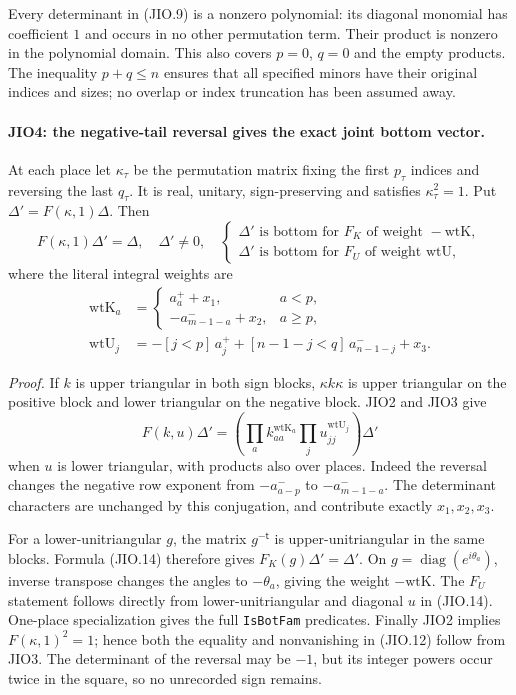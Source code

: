 Every determinant in (JIO.9) is a nonzero polynomial: its diagonal
monomial has coefficient \(1\) and occurs in no other permutation
term.  Their product is nonzero in the polynomial domain.  This
also covers \(p=0\), \(q=0\) and the empty products.  The inequality
\(p+q\le n\) ensures that all specified minors have their original
indices and sizes; no overlap or index truncation has been assumed
away.

\paragraph{JIO4: the negative-tail reversal gives the exact joint bottom vector.}
\label{claim:JIO4}
At each place let \(\kappa_\tau\) be the permutation matrix fixing
the first \(p_\tau\) indices and reversing the last \(q_\tau\).
It is real, unitary, sign-preserving and satisfies \(\kappa_\tau^2=1\).
Put \(\Delta'=F(\kappa,1)\Delta\).  Then
\[
 F(\kappa,1)\Delta'=\Delta,\quad \Delta'\ne0,
 \quad
 \begin{cases}
 \Delta'\text{ is bottom for }F_K\text{ of weight }-\mathrm{wtK},\\
 \Delta'\text{ is bottom for }F_U\text{ of weight }\mathrm{wtU},
 \end{cases}
 \tag{JIO.12}
\]
where the literal integral weights are
\[
 \begin{split}
 \mathrm{wtK}_a&=
   \begin{cases}a^+_a+x_1,&a<p,\\
                -a^-_{m-1-a}+x_2,&a\ge p,\end{cases}\\
 \mathrm{wtU}_j&=-[j<p]\,a^+_j
                  +[n-1-j<q]\,a^-_{n-1-j}+x_3 .
 \end{split}
 \tag{JIO.13}
\]

\emph{Proof.}
If \(k\) is upper triangular in both sign blocks,
\(\kappa k\kappa\) is upper triangular on the positive block
and lower triangular on the negative block.  JIO2 and JIO3 give
\[
 F(k,u)\Delta'
       =\left(\prod_a k_{aa}^{\mathrm{wtK}_a}
                    \prod_j u_{jj}^{\mathrm{wtU}_j}\right)\Delta'
 \tag{JIO.14}
\]
when \(u\) is lower triangular, with products also over places.
Indeed the reversal changes the negative row exponent from
\(-a^-_{a-p}\) to \(-a^-_{m-1-a}\).  The determinant characters
are unchanged by this conjugation, and contribute exactly
\(x_1,x_2,x_3\).

For a lower-unitriangular \(g\), the matrix \(g^{-\mathsf t}\)
is upper-unitriangular in the same blocks.  Formula (JIO.14)
therefore gives \(F_K(g)\Delta'=\Delta'\).  On
\(g=\operatorname{diag}(e^{i\theta_a})\), inverse transpose changes
the angles to \(-\theta_a\), giving the weight \(-\mathrm{wtK}\).
The \(F_U\) statement follows directly from lower-unitriangular
and diagonal \(u\) in (JIO.14).  One-place specialization gives
the full \texttt{IsBotFam} predicates.  Finally JIO2 implies
\(F(\kappa,1)^2=1\); hence both the equality and nonvanishing in
(JIO.12) follow from JIO3.  The determinant of the reversal may
be \(-1\), but its integer powers occur twice in the square, so
no unrecorded sign remains.

